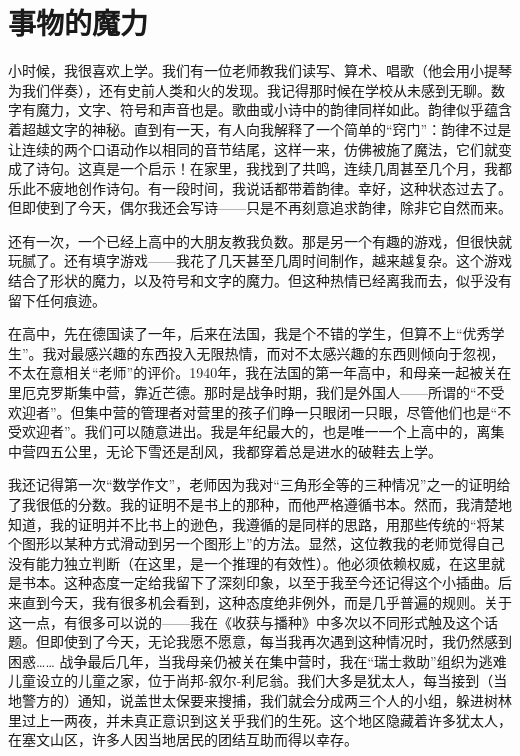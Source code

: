 
\section{事物的魔力}

小时候，我很喜欢上学。我们有一位老师教我们读写、算术、唱歌（他会用小提琴为我们伴奏），还有史前人类和火的发现。我记得那时候在学校从未感到无聊。数字有魔力，文字、符号和声音也是。歌曲或小诗中的韵律同样如此。韵律似乎蕴含着超越文字的神秘。直到有一天，有人向我解释了一个简单的“窍门”：韵律不过是让连续的两个口语动作以相同的音节结尾，这样一来，仿佛被施了魔法，它们就变成了诗句。这真是一个启示！在家里，我找到了共鸣，连续几周甚至几个月，我都乐此不疲地创作诗句。有一段时间，我说话都带着韵律。幸好，这种状态过去了。但即使到了今天，偶尔我还会写诗——只是不再刻意追求韵律，除非它自然而来。

还有一次，一个已经上高中的大朋友教我负数。那是另一个有趣的游戏，但很快就玩腻了。还有填字游戏——我花了几天甚至几周时间制作，越来越复杂。这个游戏结合了形状的魔力，以及符号和文字的魔力。但这种热情已经离我而去，似乎没有留下任何痕迹。

在高中，先在德国读了一年，后来在法国，我是个不错的学生，但算不上“优秀学生”。我对最感兴趣的东西投入无限热情，而对不太感兴趣的东西则倾向于忽视，不太在意相关“老师”的评价。1940年，我在法国的第一年高中，和母亲一起被关在里厄克罗斯集中营，靠近芒德。那时是战争时期，我们是外国人——所谓的“不受欢迎者”。但集中营的管理者对营里的孩子们睁一只眼闭一只眼，尽管他们也是“不受欢迎者”。我们可以随意进出。我是年纪最大的，也是唯一一个上高中的，离集中营四五公里，无论下雪还是刮风，我都穿着总是进水的破鞋去上学。

我还记得第一次“数学作文”，老师因为我对“三角形全等的三种情况”之一的证明给了我很低的分数。我的证明不是书上的那种，而他严格遵循书本。然而，我清楚地知道，我的证明并不比书上的逊色，我遵循的是同样的思路，用那些传统的“将某个图形以某种方式滑动到另一个图形上”的方法。显然，这位教我的老师觉得自己没有能力独立判断（在这里，是一个推理的有效性）。他必须依赖权威，在这里就是书本。这种态度一定给我留下了深刻印象，以至于我至今还记得这个小插曲。后来直到今天，我有很多机会看到，这种态度绝非例外，而是几乎普遍的规则。关于这一点，有很多可以说的——我在《收获与播种》中多次以不同形式触及这个话题。但即使到了今天，无论我愿不愿意，每当我再次遇到这种情况时，我仍然感到困惑……
战争最后几年，当我母亲仍被关在集中营时，我在“瑞士救助”组织为逃难儿童设立的儿童之家，位于尚邦-叙尔-利尼翁。我们大多是犹太人，每当接到（当地警方的）通知，说盖世太保要来搜捕，我们就会分成两三个人的小组，躲进树林里过上一两夜，并未真正意识到这关乎我们的生死。这个地区隐藏着许多犹太人，在塞文山区，许多人因当地居民的团结互助而得以幸存。

